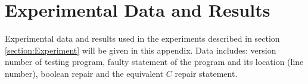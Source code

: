 \section{Experimental Data and Results}
\label{appendix:ExperimentalDataandResults}
Experimental data and results used in the experiments described in section \ref{section:Experiment} will be given in this appendix.
Data includes: version number of testing program, faulty statement of the program and its location (line number),
boolean repair and the equivalent $C$ repair statement.


